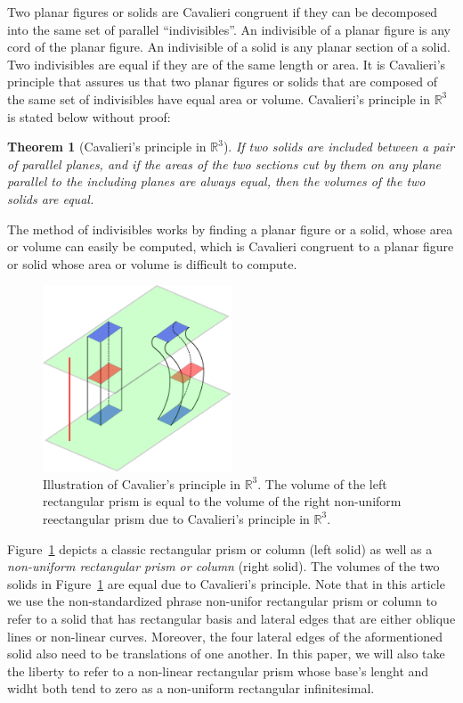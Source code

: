 \documentclass{article}
\theoremstyle{theorem}
\newtheorem{theorem}{Theorem}
\theoremstyle{definition}
\begin{document}
\noindent
Two planar figures or solids are Cavalieri congruent if they can be decomposed into the same set of parallel ``indivisibles''. An indivisible of 
a planar figure is any cord of the planar figure. An indivisible of a solid is any planar section of a solid. Two indivisibles are equal if they are of the same length or area.
It is Cavalieri's principle that assures us that two planar figures or solids that are composed of the same set of indivisibles have equal area or volume. Cavalieri's principle 
in $\mathbb{R}^3$ is stated below without proof:

\begin{theorem}[Cavalieri's principle in $\mathbb{R}^3$]
If two solids are included between a pair of parallel planes, and if the areas of
the two sections cut by them on any plane parallel to the including planes are always
equal, then the volumes of the two solids are equal.
\end{theorem}
\noindent
The method of indivisibles works by finding a planar figure or a solid, whose area or volume can easily be computed, which is Cavalieri congruent to a planar figure or solid whose 
area or volume is difficult to compute. 

\begin{figure}[htb]
\centering
\includegraphics[width=0.5\textwidth]{cav_principle.pdf}
\caption{Illustration of Cavalier's principle in $\mathbb{R}^3$. The volume of the left rectangular prism is equal to the volume of the right non-uniform reectangular prism 
due to Cavalieri's principle in $\mathbb{R}^3$.}
\label{fig:cav_principle}
\end{figure}

\noindent
Figure~\ref{fig:cav_principle} depicts a classic rectangular prism or column (left solid) as well as a \emph{non-uniform rectangular prism or column} (right solid). The volumes of the two solids in Figure~\ref{fig:cav_principle} are equal due 
to Cavalieri's principle. Note that in this article we use the non-standardized phrase non-unifor rectangular prism or column to refer to a solid that has rectangular 
basis and lateral edges that are either oblique lines or non-linear curves. Moreover, the four lateral edges of the aformentioned solid also need to be translations of one another. In this paper, we will also take the liberty to refer to a non-linear rectangular prism whose base's
lenght and widht both tend to zero as a non-uniform rectangular infinitesimal. \\
\end{document}
